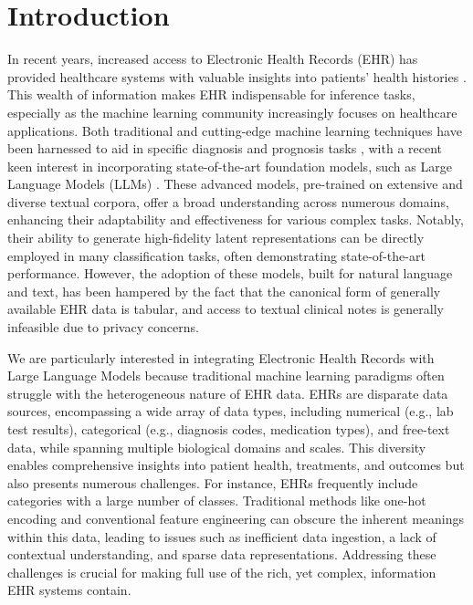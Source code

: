 \documentclass{article}
\theoremstyle{plain}
\theoremstyle{definition}
\theoremstyle{remark}
\begin{document}
\section{Introduction}
In recent years, increased access to Electronic Health Records (EHR) has provided healthcare systems with valuable insights into patients' health histories \citep{idowu2023streams}. This wealth of information makes EHR indispensable for inference tasks, especially as the machine learning community increasingly focuses on healthcare applications. Both traditional and cutting-edge machine learning techniques have been harnessed to aid in specific diagnosis and prognosis tasks \citep{shickel_deep_2018}, with a recent keen interest in incorporating state-of-the-art foundation models, such as Large Language Models (LLMs) \citep{zhao_survey_2023}. These advanced models, pre-trained on extensive and diverse textual corpora, offer a broad understanding across numerous domains, enhancing their adaptability and effectiveness for various complex tasks. Notably, their ability to generate high-fidelity latent representations can be directly employed in many classification tasks, often demonstrating state-of-the-art performance. However, the adoption of these models, built for natural language and text, has been hampered by the fact that the canonical form of generally available EHR data is tabular, and access to textual clinical notes is generally infeasible due to privacy concerns.

We are particularly interested in integrating Electronic Health Records with Large Language Models because traditional machine learning paradigms often struggle with the heterogeneous nature of EHR data. EHRs are disparate data sources, encompassing a wide array of data types, including numerical (e.g., lab test results), categorical (e.g., diagnosis codes, medication types), and free-text data, while spanning multiple biological domains and scales. This diversity enables comprehensive insights into patient health, treatments, and outcomes but also presents numerous challenges. For instance, EHRs frequently include categories with a large number of classes. Traditional methods like one-hot encoding and conventional feature engineering can obscure the inherent meanings within this data, leading to issues such as inefficient data ingestion, a lack of contextual understanding, and sparse data representations. Addressing these challenges is crucial for making full use of the rich, yet complex, information EHR systems contain.
\end{document}
